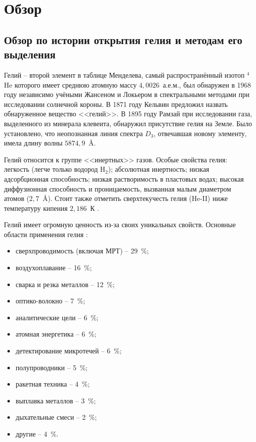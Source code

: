 \chapter{Обзор} \label{chapt_1}
\section{Обзор по истории открытия гелия и методам его выделения} \label{section_1_1}

Гелий -- второй элемент в таблице Менделева, самый распространённый  изотоп $^4$He которого имеет среднюю атомную массу  $4,0026$~а.е.м., был обнаружен в 1968 году независимо учёными Жансеном и Локьером в спектральными методами при исследовании солнечной короны. В 1871 году Кельвин предложил назвать обнаруженное вещество <<гелий>>.
В 1895 году Рамзай при исследовании газа, выделенного из минерала клевеита, обнаружил присутствие гелия на Земле. Было установлено, что неопознанная линия спектра $D_3$, отвечавшая новому элементу, имела длину волны $5874,9$~\AA \cite{Fastovskii}.

Гелий относится к группе <<инертных>> газов. Особые свойства гелия: легкость (легче только водород H$_2$); абсолютная инертность; низкая адсорбционная способность; низкая растворимость в пластовых водах; высокая диффузионная способность и проницаемость, вызванная малым диаметром атомов ($2,7$~\AA). Стоит также отметить сверхтекучесть гелия (He-II) ниже температуру кипения $2,186$~К \cite{Yakuceni_Helium}.

Гелий имеет огромную ценность из-за своих уникальных свойств. 
Основные области применения гелия \cite{Yakuceni_Helium, Yakuceni_USA}:
\begin{itemize}
\item сверхпроводимость (включая МРТ) -- 29~\%;
\item воздухоплавание  -- 16~\%;
\item сварка и резка металлов -- 12~\%;
\item оптико-волокно -- 7~\%;
\item аналитические цели  -- 6~\%;
\item атомная энергетика  -- 6~\%;
\item детектирование микротечей  -- 6~\%;
\item полупроводники  -- 5~\%;
\item ракетная техника  -- 4~\%;
\item выплавка металлов  -- 3~\%;
\item дыхательные смеси  -- 2~\%;
\item другие  -- 4~\%.	
\end{itemize}

